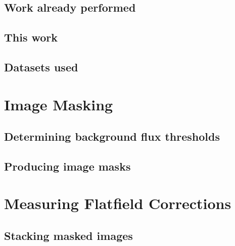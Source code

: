 \documentclass[letterpaper,11pt]{article}
\begin{document}
\subsection{Work already performed}
\label{ssec:work_already_performed}

\subsection{This work}
\label{ssec:this_work}

\subsection{Datasets used}
\label{ssec:mask_stacks_and_mean_images}

\section{Image Masking}
\label{sec:image_masking}

\subsection{Determining background flux thresholds}
\label{ssec:determining_background_flux_thresholds}

\subsection{Producing image masks}
\label{ssec:producing_image_masks}

\section{Measuring Flatfield Corrections}
\label{sec:measuring_flatfield_corrections}

\subsection{Stacking masked images}
\label{ssec:stacking_masked_images}
\end{document}
